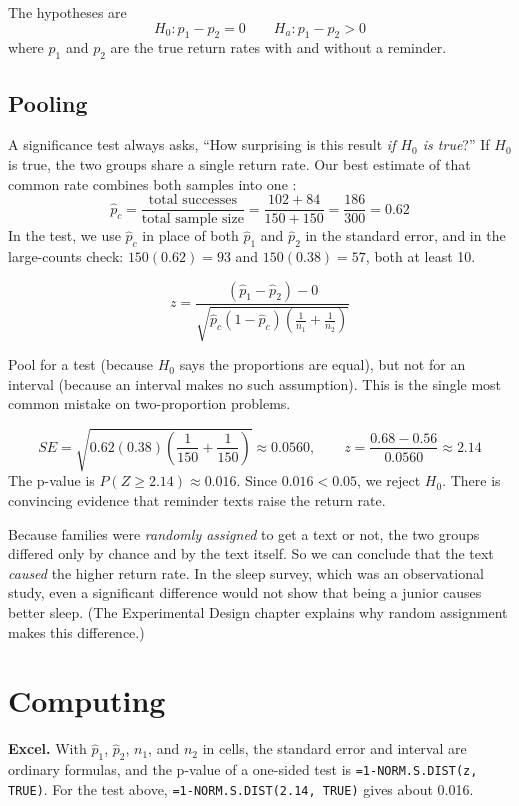 The hypotheses are
$$H_0: p_1 - p_2 = 0 \qquad H_a: p_1 - p_2 > 0$$
where $p_1$ and $p_2$ are the true return rates with and without a reminder.

\subsection{Pooling}
A significance test always asks, ``How surprising is this result \emph{if $H_0$ is true}?'' If
$H_0$ is true, the two groups share a single return rate. Our best estimate of that common rate
combines both samples into one :
$$\hat{p}_c = \frac{\text{total successes}}{\text{total sample size}} = \frac{102 + 84}{150 + 150} = \frac{186}{300} = 0.62$$
In the test, we use $\hat{p}_c$ in place of both $\hat{p}_1$ and $\hat{p}_2$ in the standard error,
and in the large-counts check: $150(0.62) = 93$ and $150(0.38) = 57$, both at least 10.

\begin{mdframed}[style = important, frametitle = {Two-Proportion $z$-Test}]
$$z = \frac{(\hat{p}_1 - \hat{p}_2) - 0}{\sqrt{\hat{p}_c(1-\hat{p}_c)\left(\frac{1}{n_1} + \frac{1}{n_2}\right)}}$$
\end{mdframed}

Pool for a test (because $H_0$ says the proportions are equal), but not for an interval (because an
interval makes no such assumption). This is the single most common mistake on two-proportion
problems.

\begin{mdframed}[frametitle = {Example}, style = important]
$$SE = \sqrt{0.62(0.38)\left(\frac{1}{150} + \frac{1}{150}\right)} \approx 0.0560, \qquad
z = \frac{0.68 - 0.56}{0.0560} \approx 2.14$$
The p-value is $P(Z \geq 2.14) \approx 0.016$. Since $0.016 < 0.05$, we reject $H_0$. There is
convincing evidence that reminder texts raise the return rate.
\end{mdframed}

Because families were \emph{randomly assigned} to get a text or not, the two groups differed only
by chance and by the text itself. So we can conclude that the text \emph{caused} the higher return
rate. In the sleep survey, which was an observational study, even a significant difference
would not show that being a junior causes better sleep. (The Experimental Design chapter explains
why random assignment makes this difference.)

\section{Computing}
\textbf{Excel.} With $\hat{p}_1$, $\hat{p}_2$, $n_1$, and $n_2$ in cells, the standard error and
interval are ordinary formulas, and the p-value of a one-sided test is
\texttt{=1-NORM.S.DIST(z, TRUE)}. For the test above, \texttt{=1-NORM.S.DIST(2.14, TRUE)} gives
about 0.016.


